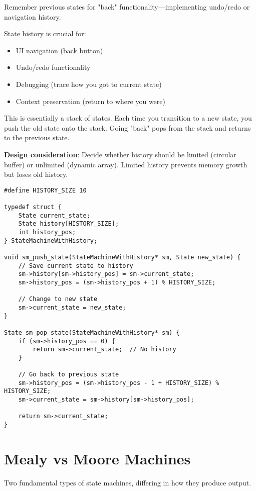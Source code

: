 Remember previous states for "back" functionality---implementing undo/redo or navigation history.

State history is crucial for:
\begin{itemize}
    \item UI navigation (back button)
    \item Undo/redo functionality
    \item Debugging (trace how you got to current state)
    \item Context preservation (return to where you were)
\end{itemize}

This is essentially a stack of states. Each time you transition to a new state, you push the old state onto the stack. Going "back" pops from the stack and returns to the previous state.

\textbf{Design consideration}: Decide whether history should be limited (circular buffer) or unlimited (dynamic array). Limited history prevents memory growth but loses old history.

\begin{lstlisting}
#define HISTORY_SIZE 10

typedef struct {
    State current_state;
    State history[HISTORY_SIZE];
    int history_pos;
} StateMachineWithHistory;

void sm_push_state(StateMachineWithHistory* sm, State new_state) {
    // Save current state to history
    sm->history[sm->history_pos] = sm->current_state;
    sm->history_pos = (sm->history_pos + 1) % HISTORY_SIZE;

    // Change to new state
    sm->current_state = new_state;
}

State sm_pop_state(StateMachineWithHistory* sm) {
    if (sm->history_pos == 0) {
        return sm->current_state;  // No history
    }

    // Go back to previous state
    sm->history_pos = (sm->history_pos - 1 + HISTORY_SIZE) % HISTORY_SIZE;
    sm->current_state = sm->history[sm->history_pos];

    return sm->current_state;
}
\end{lstlisting}

\section{Mealy vs Moore Machines}

Two fundamental types of state machines, differing in how they produce output.

